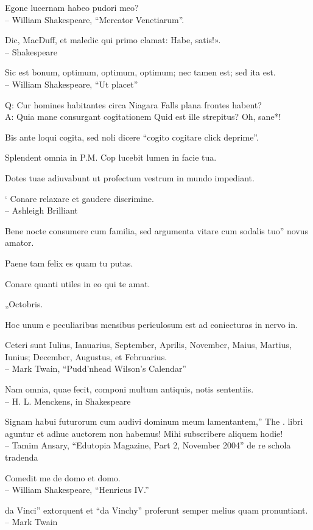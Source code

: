 \documentclass[titlepage,12pt]{memoir}
\begin{document}
Egone lucernam habeo pudori meo?
\\-- William Shakespeare, “Mercator Venetiarum”.

Dic, MacDuff, et maledic qui primo clamat: Habe, satis!».
\\-- Shakespeare

Sic est bonum, optimum, optimum, optimum;
nec tamen est; sed ita est.
\\-- William Shakespeare, “Ut placet”

Q: Cur homines habitantes circa Niagara Falls plana frontes habent?\\
A: Quia mane consurgant cogitationem Quid est ille strepitus?
Oh, sane*!

Bis ante loqui cogita, sed noli dicere “cogito cogitare click deprime”.

Splendent omnia in P.M. Cop lucebit lumen in facie tua.

Dotes tuae adiuvabunt ut profectum vestrum in mundo impediant.

‘ Conare relaxare et gaudere discrimine.
\\-- Ashleigh Brilliant

Bene nocte consumere cum familia, sed argumenta vitare cum sodalis tuo”
novus amator.

Paene tam felix es quam tu putas.

Conare quanti utiles in eo qui te amat.

„Octobris.

Hoc unum e peculiaribus mensibus periculosum est ad coniecturas in nervo in.

Ceteri sunt Iulius, Ianuarius, September, Aprilis, November, Maius, Martius, Iunius;
December, Augustus, et Februarius.
\\-- Mark Twain, “Pudd’nhead Wilson’s Calendar”

Nam omnia, quae fecit, componi multum antiquis, notis sententiis.
\\-- H. L. Menckens, in Shakespeare

Signam habui futurorum cum audivi dominum meum lamentantem,” The .
libri aguntur et adhuc auctorem non habemus! Mihi subscribere aliquem
hodie!
\\-- Tamim Ansary, “Edutopia Magazine, Part 2, November 2004”
de re schola tradenda

Comedit me de domo et domo.
\\-- William Shakespeare, “Henricus IV.”

da Vinci” extorquent et “da Vinchy” proferunt
semper melius quam pronuntiant.
\\-- Mark Twain
\end{document}
